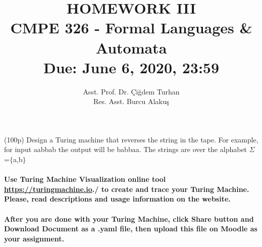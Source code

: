\documentclass[12pt]{article}
\begin{document}
\author{ Asst. Prof. Dr. Çiğdem Turhan\\Res. Asst. Burcu Alakuş}
\title{HOMEWORK III\\CMPE 326 - Formal Languages \& Automata\\  Due: June 6, 2020, 23:59}
\date{\vspace{-5ex}}
\maketitle

\medskip



\item (100p) Design a Turing machine that reverses the string in the tape. For example, for input aabbab the output will be babbaa. The strings are over the alphabet $\Sigma$=$\{$a,b$\}$\\\\

\textbf{Use Turing Machine Visualization online tool \url{https://turingmachine.io}./ to create and trace your Turing Machine. Please, read descriptions and usage information on the website.}\\\\
\textbf{After you are done with your Turing Machine, click Share button and Download Document as a .yaml file, then upload this file on Moodle as your assignment.}
\end{document}
